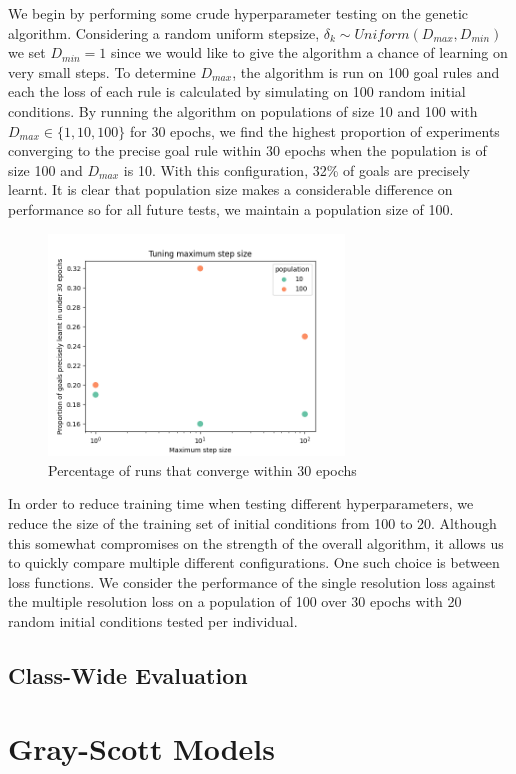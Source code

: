 We begin by performing some crude hyperparameter testing on the genetic algorithm. Considering a random uniform stepsize, $\delta_k \sim \mathit{Uniform}(D_{max}, D_{min})$ we set $D_{min} = 1$ since we would like to give the algorithm a chance of learning on very small steps. To determine $D_{max}$, the algorithm is run on 100 goal rules and each the loss of each rule is calculated by simulating on 100 random initial conditions. By running the algorithm on populations of size 10 and 100 with $D_{max} \in \{1, 10, 100\}$ for 30 epochs, we find the highest proportion of experiments converging to the precise goal rule within 30 epochs when the population is of size 100 and $D_{max}$ is 10. With this configuration, 32\% of goals are precisely learnt. It is clear that population size makes a considerable difference on performance so for all future tests, we maintain a population size of 100.\\

\begin{figure}[!h]
\centering
\includegraphics[width=0.7\textwidth]{images/tune-max-step.png}
\caption{Percentage of runs that converge within 30 epochs}
\label{fig:tune-max-step}
\end{figure}

In order to reduce training time when testing different hyperparameters, we reduce the size of the training set of initial conditions from 100 to 20. Although this somewhat compromises on the strength of the overall algorithm, it allows us to quickly compare multiple different configurations. One such choice is between loss functions. We consider the performance of the single resolution loss against the multiple resolution loss on a population of 100 over 30 epochs with 20 random initial conditions tested per individual.\\    


\subsection{Class-Wide Evaluation}


\section{Gray-Scott Models}